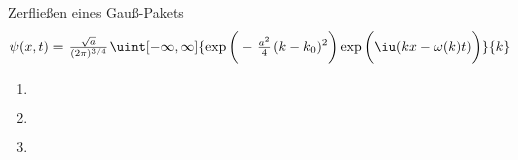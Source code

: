 \documentclass{alex_hü}
\begin{document}
\begin{mybox}{Zerfließen eines Gauß-Pakets}
	\vspace{-0.4cm}
	\centering \[ \psi(x, t) = \tfrac{\sqrt{a}}{(2\pi)^{3/4}} \uint[-\infty,\infty]{\exp\bigg(-\tfrac{a^2}{4}(k - k_0)^2 \bigg)\exp\bigg(\iu(kx - \omega(k)t) \bigg)}{k} \]
	\tcblower
	\begin{enumerate}
		\item \(  \)
	\tcbline
		\item \(  \)
	\tcbline
		\item \(  \)
	\end{enumerate}
\end{mybox}
\end{document}
